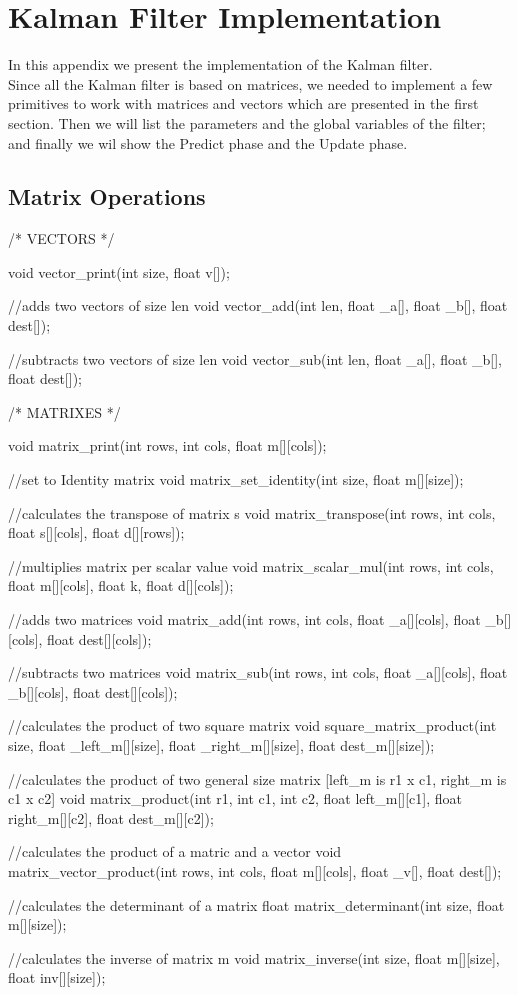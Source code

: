 \chapter{Kalman Filter Implementation}\label{kf_implementation}

In this appendix we present the implementation of the Kalman filter.\\
Since all the Kalman filter is based on matrices, we needed to implement a few primitives to work with matrices and vectors which are presented in the first section. Then we will list the parameters and the global variables of the filter; and finally we wil show the Predict phase and the Update phase.\\

\section{Matrix Operations}
\begin{ccode}
	/* VECTORS */

	void vector_print(int size, float v[]);

	//adds two vectors of size len
	void vector_add(int len, float _a[], float _b[], float dest[]);

	//subtracts two vectors of size len
	void vector_sub(int len, float _a[], float _b[], float dest[]);

	/* MATRIXES */

	void matrix_print(int rows, int cols, float m[][cols]);

	//set to Identity matrix
	void matrix_set_identity(int size, float m[][size]);

	//calculates the transpose of matrix s
	void matrix_transpose(int rows, int cols, float s[][cols], float d[][rows]);

	//multiplies matrix per scalar value
	void matrix_scalar_mul(int rows, int cols, float m[][cols], float k, float d[][cols]);

	//adds two matrices
	void matrix_add(int rows, int cols, float _a[][cols], float _b[][cols], float dest[][cols]);

	//subtracts two matrices
	void matrix_sub(int rows, int cols, float _a[][cols], float _b[][cols], float dest[][cols]);

	//calculates the product of two square matrix
	void square_matrix_product(int size, float _left_m[][size], float _right_m[][size], float dest_m[][size]);

	//calculates the product of two general size matrix [left_m is r1 x c1, right_m is c1 x c2]
	void matrix_product(int r1, int c1, int c2, float left_m[][c1], float right_m[][c2], float dest_m[][c2]);

	//calculates the product of a matric and a vector
	void matrix_vector_product(int rows, int cols, float m[][cols], float _v[], float dest[]);

	//calculates the determinant of a matrix
	float matrix_determinant(int size, float m[][size]);

	//calculates the inverse of matrix m
	void matrix_inverse(int size, float m[][size], float inv[][size]);
\end{ccode}


